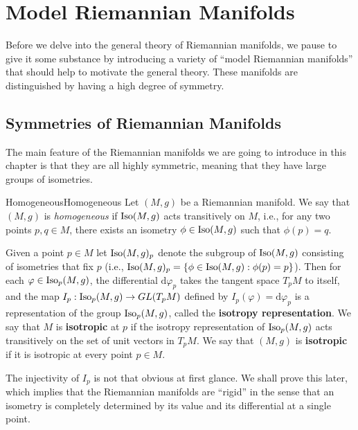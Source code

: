 \documentclass[../main.tex]{subfiles}
\begin{document}
\chapter{Model Riemannian Manifolds}

Before we delve into the general theory of Riemannian manifolds, we pause to give it some substance by introducing a variety of ``model Riemannian manifolds'' that should help to motivate the general theory. These manifolds are distinguished by having a high degree of symmetry.

\section{Symmetries of Riemannian Manifolds}
The main feature of the Riemannian manifolds we are going to introduce in this chapter is that they are all highly symmetric, meaning that they have large groups of isometries.

\begin{definition}{Homogeneous}{Homogeneous}
	Let $(M,g)$ be a Riemannian manifold. We say that $(M,g)$ is \emph{homogeneous} if $\operatorname{Iso}(M,g)$ acts transitively on $M$, i.e., for any two points $p,q \in M$, there exists an isometry $\phi \in \operatorname{Iso}(M,g)$ such that $\phi(p) = q$.
\end{definition}

Given a point $p \in M$ let $\operatorname{Iso}(M,g)_p$ denote the subgroup of $\operatorname{Iso}(M,g)$ consisting of isometries that fix $p$ (i.e., $\operatorname{Iso}(M,g)_p = \{\phi \in \operatorname{Iso}(M,g) : \phi(p) = p\}$). Then for each $\varphi \in \operatorname{Iso}_p(M,g)$, the differential $\mathrm{d} \varphi_p$ takes the tangent space $T_p M$ to itself, and the map $I_p: \operatorname{Iso}_p(M,g) \to GL(T_p M)$ defined by $I_p(\varphi) = \mathrm{d} \varphi_p$ is a representation of the group $\operatorname{Iso}_p(M,g)$, called the \textbf{isotropy representation}. We say that $M$ is \textbf{isotropic} at $p$ if the isotropy representation of $\operatorname{Iso}_p(M,g)$ acts transitively on the set of unit vectors in $T_p M$. We say that $(M,g)$ is \textbf{isotropic} if it is isotropic at every point $p \in M$.

\begin{remark}
	The injectivity of $I_p$ is not that obvious at first glance. We shall prove this later, which implies that the Riemannian manifolds are ``rigid'' in the sense that an isometry is completely determined by its value and its differential at a single point.
\end{remark}
\end{document}
